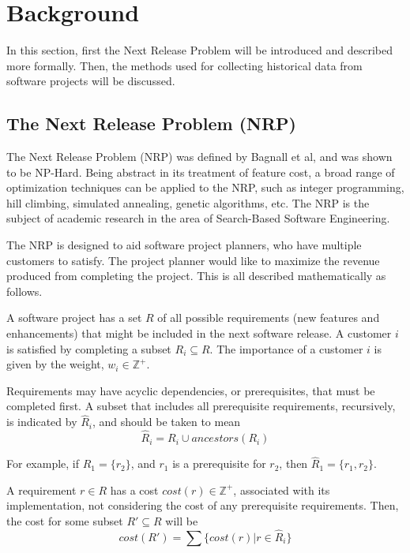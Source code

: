 \documentclass[a4paper]{scrartcl}
\begin{document}
\section{Background}
\label{sec:background}
In this section, first the Next Release Problem will be introduced and described more formally. Then, the methods used for collecting historical data from software projects will be discussed.

\subsection{The Next Release Problem (NRP)}
The Next Release Problem (NRP) was defined by Bagnall et al\cite{2001_bagnall_nrp}, and was shown to be NP-Hard. Being abstract in its treatment of feature cost, a broad range of optimization techniques can be applied to the NRP, such as integer programming, hill climbing, simulated annealing, genetic algorithms, etc. The NRP is the subject of academic research in the area of Search-Based Software Engineering\cite{2010_jiang_hybrid,2012_xuan_solving,2007_zhang_multi_obj_nrp}.

The NRP is designed to aid software project planners, who have multiple customers to satisfy. The project planner would like to maximize the revenue produced from completing the project. This is all described mathematically as follows.

A software project has a set $R$ of all possible requirements (new features and enhancements) that might be included in the next software release. A customer $i$ is satisfied by completing a subset $R_i \subseteq R$. The importance of a customer $i$ is given by the weight, $w_i \in \mathbb{Z}^+$.

Requirements may have acyclic dependencies, or prerequisites, that must be completed first. A subset that includes all prerequisite requirements, recursively, is indicated by $\hat{R}_i$, and should be taken to mean
\begin{equation}
\hat{R}_i = R_i \cup ancestors(R_i)
\end{equation}

For example, if $R_1 = \{r_2\}$, and $r_1$ is a prerequisite for $r_2$, then $\hat{R}_1 = \{r_1,r_2\}$.

A requirement $r \in R$ has a cost $cost(r) \in \mathbb{Z}^+$, associated with its implementation, not considering the cost of any prerequisite requirements. Then, the cost for some subset $R' \subseteq R$ will be
\begin{equation}
cost(R') = \sum \{cost(r) | r \in \hat{R}_i \}
\end{equation}
\end{document}
